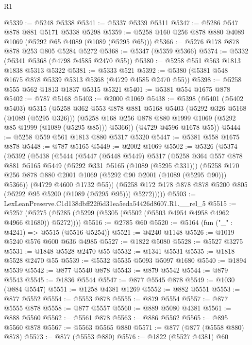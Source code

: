 \begin{lexlean}{R1}
\begin{coremodule}
@5339 := @5248 @5338
@5341 := @5337 @5339 @5311
@5347 := @5286 @547 @878 @881 @5171 @5338 @5298
@5359 := @5258 @160 @256 @878 @880 @4089 @1069 (@5292 @65 @4089 (@1089 (@5295 @65)))
@5366 := @5276 @178 @878 @878 @253 @805 @5284 @5272
@5368 := @5347 (@5359 @5366)
@5374 := @5332 (@5341 @5368 (@4798 @4585 @2470 @55))
@5380 := @5258 @551 @563 @1813 @1838 @5313 @5322
@5381 := @5333 @521
@5392 := @5380 (@5381 @548 @1675 @878 @5339 @5313 @5368 (@4729 @4585 @2470 @55))
@5398 := @5258 @555 @562 @1813 @1837 @5315 @5321
@5401 := @5381 @554 @1675 @878
@5402 := @787 @5168
@5403 := @2000 @1069
@5438 := @5398
    (@5401
      (@5402 @5403)
      @5315
      (@5258
        @362
        @553
        @878
        @881
        @5168
        @5403
        (@5292 @326 @5168 (@1089 (@5295 @326)))
        (@5258 @168 @256 @878 @880 @1999 @1069 (@5292 @85 @1999 (@1089 (@5295 @85))) @5366))
      (@4729 @4596 @1678 @55))
@5444 := @5258 @559 @561 @1813 @880 @5317 @5320
@5447 := @5381 @558 @1675 @878
@5448 := @787 @5165
@5449 := @2002 @1069
@5502 := @5326
    (@5374
      (@5392
        (@5438
          (@5444
            (@5447
              (@5448 @5449)
              @5317
              (@5258
                @364
                @557
                @878
                @881
                @5165
                @5449
                (@5292 @331 @5165 (@1089 (@5295 @331)))
                (@5258 @170 @256 @878 @880 @2001 @1069 (@5292 @90 @2001 (@1089 (@5295 @90))) @5366))
              (@4729 @4600 @1732 @55))
            (@5258 @172 @178 @878 @878 @5200 @805 (@5292 @95 @5200 (@1089 (@5295 @95))) @5272)))))
@5503 := LexLeanPreserve.C1d138dbff22f6d31ea5eda54426d8607.R1.__rel_5
@5515 := @5257 (@5275 (@5285 (@5299 (@5305 (@5502 (@5503 @4954 @4958 @4962 @4966 @1680)) @5272))))
@5516 := @2785 @60
@5520 := @5164 (fun ("_" : @4241) => @5515 (@5516 @5254))
@5521 := @4240 @1148
@5526 := @1019 @5240 @576 @600 @636 @4985
@5527 := @1822 @5080
@5528 := @5527 @3275
@5531 := @1848 @5528 @2470 @55
@5532 := @1341 @5531
@5535 := @1818 @5528 @2470 @55
@5539 := @5532 @5535 @5093 @5097 @1680
@5540 := @1894 @5539
@5542 := @877 @5540 @878
@5543 := @879 @5542
@5544 := @879 @5543
@5545 := @1836 @5544
@5547 := @877 @5545 @878
@5549 := @1030 (@884 @5547)
@5551 := @1258 @4381 @1269
@5552 := @882 @5551
@5553 := @877 @5552
@5554 := @5553 @878
@5555 := @879 @5554
@5557 := @877 @5555 @878
@5558 := @877 @5557
@5560 := @889 @5080 @4381
@5561 := @888 @5560
@5562 := @5561 @878
@5563 := @886 @5562
@5565 := @895 @5560 @878
@5567 := @5563 @5565 @880
@5571 := @877 (@877 (@5558 @880) @878)
@5573 := @877 (@5553 @880)
@5576 := @1822 (@5527 @4381) @60

\end{coremodule}
\end{lexlean}
